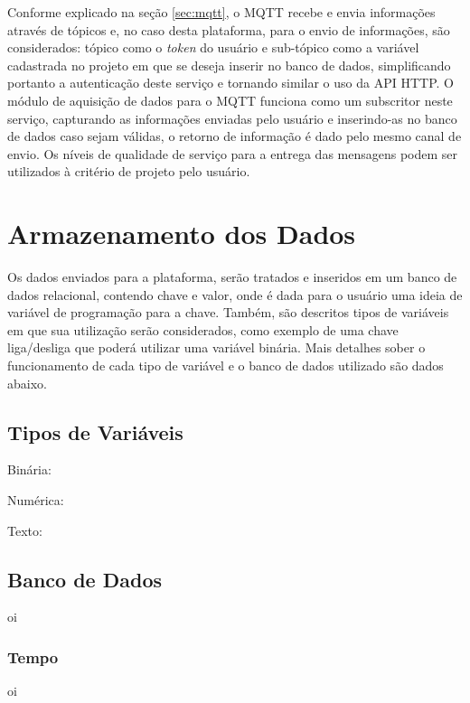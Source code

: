     	Conforme explicado na seção \ref{sec:mqtt}, o MQTT recebe e envia informações através de tópicos e, no caso desta plataforma, para o envio de informações, são considerados: tópico como o \textit{token} do usuário e sub-tópico como a variável cadastrada no projeto em que se deseja inserir no banco de dados, simplificando portanto a autenticação deste serviço e tornando similar o uso da \gls{API} \gls{HTTP}. O módulo de aquisição de dados para o MQTT funciona como um subscritor neste serviço, capturando as informações enviadas pelo usuário e inserindo-as no banco de dados caso sejam válidas, o retorno de informação é dado pelo mesmo canal de envio. Os níveis de qualidade de serviço para a entrega das mensagens podem ser utilizados à critério de projeto pelo usuário.

    \section{Armazenamento dos Dados}
    \label{sec:armazenamento-dados}
    
    Os dados enviados para a plataforma, serão tratados e inseridos em um banco de dados relacional, contendo chave e valor, onde é dada para o usuário uma ideia de variável de programação para a chave. Também, são descritos tipos de variáveis em que sua utilização serão considerados, como exemplo de uma chave liga/desliga que poderá utilizar uma variável binária. Mais detalhes sober o funcionamento de cada tipo de variável e o banco de dados utilizado são dados abaixo.
    
        \subsection{Tipos de Variáveis}
        \label{sec:tipos-variaveis}
            
        \begin{alineascomponto}
            \item Binária: 
            \item Numérica: 
            \item Texto: 
        \end{alineascomponto}
        
        \subsection{Banco de Dados}
        \label{sec:banco-dados}
        oi
        
        \subsubsection{Tempo}
        \label{sec:tempo}
        oi
    
